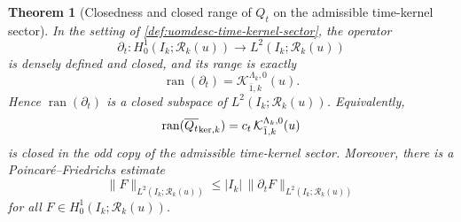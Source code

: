 \documentclass[11pt]{article}
\theoremstyle{definition}
\theoremstyle{plain}
\newtheorem{theorem}[definition]{Theorem}
\theoremstyle{remark}
\newcommand{\Islab}{I_k}
\newcommand{\Qt}{Q_t}
\begin{document}
\begin{theorem}[Closedness and closed range of \texorpdfstring{\(Q_t\)}{Qt} on the admissible time-kernel sector]
\label{thm:uomdesc-qt-kernel}
In the setting of \cref{def:uomdesc-time-kernel-sector}, the operator
\[
\partial_t:
H_0^1(\Islab;\mathcal R_k(u))
\to
L^2(\Islab;\mathcal R_k(u))
\]
is densely defined and closed, and its range is exactly
\[
\operatorname{ran}(\partial_t)
=
\mathcal K_{\bar 1,k}^{\Lambda_k,0}(u).
\]
Hence \(\operatorname{ran}(\partial_t)\) is a closed subspace of
\(L^2(\Islab;\mathcal R_k(u))\).
Equivalently,
\[
\operatorname{ran}(\overline{\Qt}_{{\rm ker},k})
=
c_t\,\mathcal K_{\bar 1,k}^{\Lambda_k,0}(u)
\]
is closed in the odd copy of the admissible time-kernel sector.
Moreover, there is a Poincar\'e--Friedrichs estimate
\[
\|F\|_{L^2(\Islab;\mathcal R_k(u))}
\le
|\Islab|\,\|\partial_t F\|_{L^2(\Islab;\mathcal R_k(u))}
\]
for all \(F\in H_0^1(\Islab;\mathcal R_k(u))\).
\end{theorem}
\end{document}
